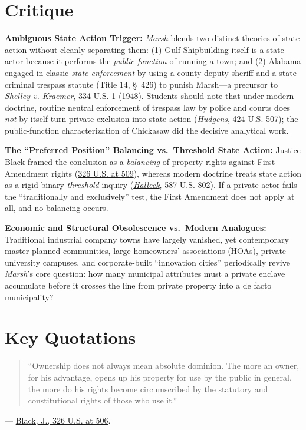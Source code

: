 \documentclass[12pt]{article}
\begin{document}
\section{Critique}
\textbf{Ambiguous State Action Trigger:} \textit{Marsh} blends two distinct theories of state action without cleanly separating them: (1) Gulf Shipbuilding itself is a state actor because it performs the \textit{public function} of running a town; and (2) Alabama engaged in classic \textit{state enforcement} by using a county deputy sheriff and a state criminal trespass statute (Title 14, \S~426) to punish Marsh---a precursor to \textit{Shelley v. Kraemer}, 334 U.S. 1 (1948). Students should note that under modern doctrine, routine neutral enforcement of trespass law by police and courts does \textit{not} by itself turn private exclusion into state action (\href{https://supreme.justia.com/cases/federal/us/424/507/}{\textit{Hudgens}}, 424 U.S. 507); the public-function characterization of Chickasaw did the decisive analytical work.

\textbf{The ``Preferred Position'' Balancing vs.\ Threshold State Action:} Justice Black framed the conclusion as a \textit{balancing} of property rights against First Amendment rights (\href{https://supreme.justia.com/cases/federal/us/326/501/}{326 U.S. at 509}), whereas modern doctrine treats state action as a rigid binary \textit{threshold} inquiry (\href{https://supreme.justia.com/cases/federal/us/587/17-1702/}{\textit{Halleck}}, 587 U.S. 802). If a private actor fails the ``traditionally and exclusively'' test, the First Amendment does not apply at all, and no balancing occurs.

\textbf{Economic and Structural Obsolescence vs.\ Modern Analogues:} Traditional industrial company towns have largely vanished, yet contemporary master-planned communities, large homeowners' associations (HOAs), private university campuses, and corporate-built ``innovation cities'' periodically revive \textit{Marsh}'s core question: how many municipal attributes must a private enclave accumulate before it crosses the line from private property into a de facto municipality?

\section{Key Quotations}
\begin{quote}
``Ownership does not always mean absolute dominion. The more an owner, for his advantage, opens up his property for use by the public in general, the more do his rights become circumscribed by the statutory and constitutional rights of those who use it.''
\end{quote}
\noindent --- \href{https://supreme.justia.com/cases/federal/us/326/501/}{Black, J., 326 U.S. at 506}.
\end{document}
